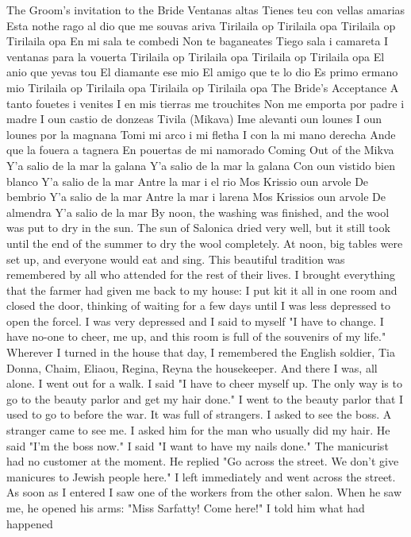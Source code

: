 The Groom’s invitation to the Bride 
Ventanas altas 
Tienes teu con vellas amarias 
Esta nothe rago al dio 
que me souvas ariva 
Tirilaila op Tirilaila opa 
Tirilaila op Tirilaila opa 
En mi sala te combedi 
Non te baganeates 
Tiego sala i camareta 
I ventanas para la vouerta 
Tirilaila op Tirilaila opa 
Tirilaila op Tirilaila opa 
El anio que yevas tou 
El diamante ese mio 
El amigo que te lo dio 
Es primo ermano mio 
Tirilaila op Tirilaila opa 
Tirilaila op Tirilaila opa 
The Bride's Acceptance 
A tanto fouetes i venites 
I en mis tierras me trouchites 
Non me emporta por padre i madre 
I oun castio de donzeas 
Tivila (Mikava) 
Ime alevanti oun lounes 
I oun lounes por la magnana 
Tomi mi arco i mi fletha 
I con la mi mano derecha 
Ande que la fouera a tagnera 
En pouertas de mi namorado 
Coming Out of the Mikva 
Y'a salio de la mar la galana 
Y'a salio de la mar la galana 
Con oun vistido bien blanco 
Y'a salio de la mar 
Antre la mar i el rio 
Mos Krissio oun arvole 
De bembrio 
Y'a salio de la mar 
Antre la mar i larena 
Mos Krissios oun arvole 
De almendra 
Y'a salio de la mar 
By noon, the washing was finished, and the wool was put to dry in 
the sun. The sun of Salonica dried very well, but it still took until 
the end of the summer to dry the wool completely. At noon, big tables 
were set up, and everyone would eat and sing. This beautiful tradition 
was remembered by all who attended for the rest of their lives. 
I brought everything that the farmer had given me back to my house: 
I put kit it all in one room and closed the door, thinking of waiting for 
a few days until I was less depressed to open the forcel. I was very depressed and I said to myself "I have to change. I have no-one to cheer, 
me up, and this room is full of the souvenirs of my life." Wherever I 
turned in the house that day, I remembered the English soldier, Tia Donna, 
Chaim, Eliaou, Regina, Reyna the housekeeper. And there I was, all alone. 
I went out for a walk. I said "I have to cheer myself up. The only 
way is to go to the beauty parlor and get my hair done." I went to the 
beauty parlor that I used to go to before the war. It was full of strangers. I asked to see the boss. A stranger came to see me. I asked him
for the man who usually did my hair. He said "I'm the boss now." I said 
"I want to have my nails done." The manicurist had no customer at the 
moment. He replied "Go across the street. We don't give manicures to 
Jewish people here." 
I left immediately and went across the street. As soon as I entered
I saw one of the workers from the other salon. When he saw me, he opened his arms: "Miss Sarfatty! Come here!" I told him what had happened 
